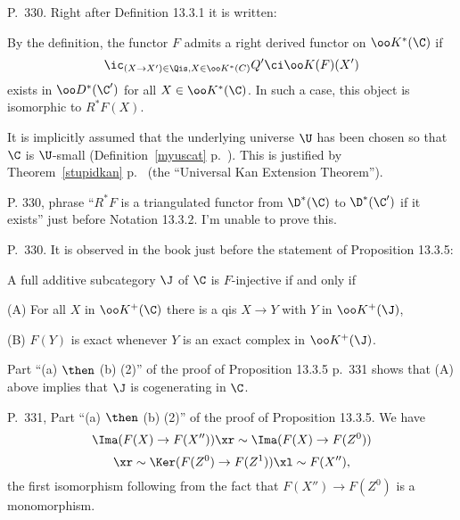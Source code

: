 \documentclass[12pt]{article}
\theoremstyle{remark}
\theoremstyle{definition}
\begin{document}
\begin{s}%
P.~330. Right after Definition 13.3.1 it is written: 

By the definition, the functor $F$ admits a right derived functor on $\oo K^*(\C)$ if 
$$
\ic_{(X\to X')\in\Qis,X\in\oo K^*(C)}Q'\ci\oo K(F)(X')
$$ 
exists in $\oo D^*(\C')$ for all $X\in\oo K^*(\C)$. In such a case, this object is isomorphic to $R^*F(X)$.

It is implicitly assumed that the underlying universe $\U$ has been chosen so that $\C$ is $\U$-small (Definition~\ref{myuscat} p.~). This is justified by Theorem~\ref{stupidkan} p.~ (the ``Universal Kan Extension Theorem''). %
\end{s}

%

\begin{uspb}
P. 330, phrase ``$R^*F$ is a triangulated functor from $\D^*(\C)$ to $\D^*(\C')$ if it exists'' just before Notation 13.3.2. I'm unable to prove this.
\end{uspb}

%

\begin{s}
P.~330. It is observed in the book just before the statement of Proposition 13.3.5:

A full additive subcategory $\J$ of $\C$ is $F$-injective if and only if 

\nn(A) For all $X$ in $\oo K^+(\C)$ there is a qis $X\to Y$ with $Y$ in $\oo K^+(\J)$,

\nn(B) $F(Y)$ is exact whenever $Y$ is an exact complex in $\oo K^+(\J)$.

Part ``(a) $\then$ (b) (2)'' of the proof of Proposition 13.3.5 p.~331 shows that (A) above implies that $\J$ is cogenerating in $\C$.
\end{s}

%

\begin{s}
P.~331, Part ``(a) $\then$ (b) (2)'' of the proof of Proposition 13.3.5. %
We have 
$$
\Ima(F(X)\to F(X''))\xr\sim\Ima(F(X)\to F(Z^0))
$$
$$
\xr\sim\Ker(F(Z^0)\to F(Z^1))\xl\sim F(X''),
$$ 
the first isomorphism following from the fact that $F(X'')\to F(Z^0)$ is a monomorphism.
\end{s}
\end{document}
